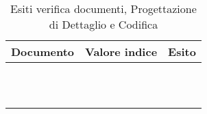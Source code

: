 	\begin{table}[H]
	\centering
	\begin{tabular}{ | c | c | c | }
    \hline
    Documento & Valore indice & Esito \\ \hline
    \AnalisiDeiRequisiti{} &  &   \\ \hline
    \DefinizioneDiProdotto{} &  &   \\ \hline
    \Glossario{} &  &   \\ \hline
    \ManualeAdmin{} &  &   \\ \hline
    \ManualeSviluppatore{} &  &   \\ \hline
    \ManualeUtente{} &  &   \\ \hline
    \NormeDiProgetto{} &  &   \\ \hline
    \PianoDiProgetto{} &  &   \\ \hline
    \PianoDiQualifica{} &  &   \\ \hline
    \SpecificaTecnica{} &  &  \\ \hline
    \StudioDiFattibilita{} &  &   \\ \hline
    \end{tabular}
	\caption{Esiti verifica documenti, Progettazione di Dettaglio e Codifica}
	\end{table}

	 	
	 	
	 
	 
